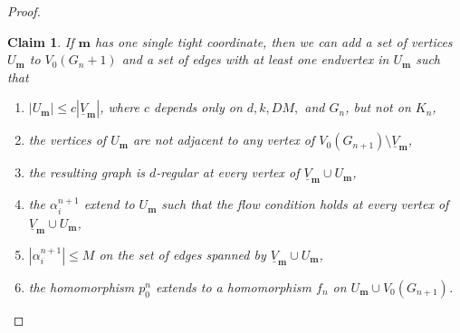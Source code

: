 \documentclass[10pt,a4paper]{amsart}
\newtheorem{claim}{Claim}
\begin{document}
\begin{proof}
\begin{claim} \label{lemma:surgery}
If $\mathbf{m}$ has one single tight coordinate, then we can add a set of vertices $U_{\mathbf{m}}$ to $V_0({G_n+1})$ and a set of edges with at least one endvertex in $U_{\mathbf{m}}$ such that 

\begin{enumerate}

\item \label{egy}
$|U_{\mathbf{m}}| \leq c|\underline{V}_{\mathbf{m}}|$, where $c$ depends only on $d, k, DM,$ and $G_n$, but not on $K_n$,

\item 
the vertices of $U_{\mathbf{m}}$ are not adjacent to any vertex of 
$V_0(G_{n+1}) \setminus \underline{V}_{\mathbf{m}}$,

\item 
the resulting graph is $d$-regular at every vertex of $\underline{V}_{\mathbf{m}} \cup U_{\mathbf{m}}$,

\item \label{negy}
the $\alpha^{n+1}_i$ extend to $U_{\mathbf{m}}$ such that the flow condition holds at every vertex of $\underline{V}_{\mathbf{m}} \cup U_{\mathbf{m}}$,


\item \label{ot}
$|\alpha^{n+1}_i| \leq M$ on the set of edges spanned by $\underline{V}_{\mathbf{m}} \cup U_{\mathbf{m}}$,

\item
the homomorphism $p_0^n$ extends to a homomorphism $f_n$ on $U_{\mathbf{m}} \cup V_0(G_{n+1})$.


\end{enumerate} 
\end{claim}


\end{proof}
\end{document}
